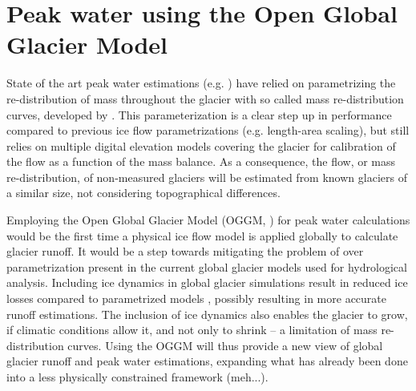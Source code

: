 \documentclass[12pt, a4paper]{article}
\begin{document}
\section{Peak water using the Open Global Glacier Model}
State of the art peak water estimations (e.g.
\cite{rounceGlacierMassChange2020,hussGlobalscaleHydrologicalResponse2018}) have
relied on parametrizing the re-distribution of mass throughout the glacier with
so called mass re-distribution curves, developed by
\textcite{hussFutureHighmountainHydrology2010}. This parameterization is a clear
step up in performance compared to previous ice flow parametrizations (e.g.
length-area scaling), but still relies on multiple digital elevation models
covering the glacier for calibration of the flow as a function of the mass
balance. As a consequence, the flow, or mass re-distribution, of non-measured
glaciers will be estimated from known glaciers of a similar size, not
considering topographical differences. 

Employing the Open Global Glacier Model (OGGM,
\cite{maussionOpenGlobalGlacier2019}) for peak water calculations would be the
first time a physical ice flow model is applied globally to calculate glacier
runoff. It would be a step towards mitigating the problem of over
parametrization present in the current global glacier models used for
hydrological analysis. Including ice dynamics in global glacier simulations
result in reduced ice losses compared to parametrized models
\parencite{zekollariModellingFutureEvolution2019}, possibly resulting in more
accurate runoff estimations. The inclusion of ice dynamics also enables the
glacier to grow, if climatic conditions allow it, and not only to shrink -- a
limitation of mass re-distribution curves. Using the OGGM will thus provide a
new view of global glacier runoff and peak water estimations, expanding what has
already been done into a less physically constrained framework (meh...).

\end{document}
